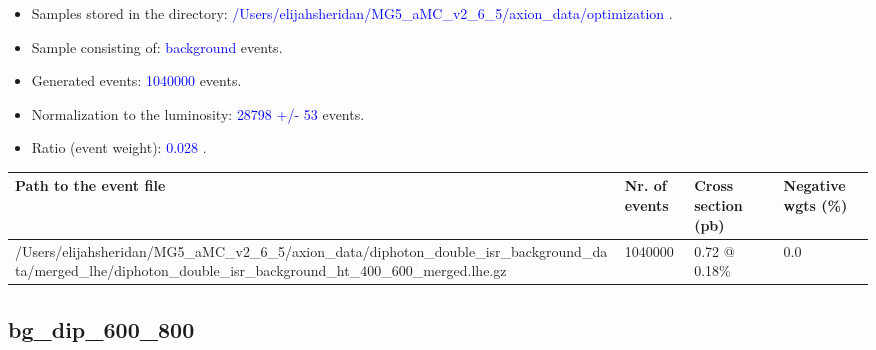 \documentclass[a4paper, 10pt]{article}
\begin{document}
\begin{itemize}
  \item Samples stored in the directory: \textcolor{blue}{/\-Users/\-elijahsheridan/\-MG5\_aMC\_v2\_6\_5/\-axion\_data/\-optimization} .
   \item Sample consisting of: \textcolor{blue}{background}  events.
   \item Generated events: \textcolor{blue}{1040000 }  events.
   \item Normalization to the luminosity: \textcolor{blue}{28798}\textcolor{blue}{ +/\-- }\textcolor{blue}{53 }  events.
   \item Ratio (event weight): \textcolor{blue}{0.028 } .  
 
\end{itemize}
\begin{table}[H]
  \begin{center}
    \begin{tabular}{|m{55.0mm}|m{25.0mm}|m{30.0mm}|m{30.0mm}|}
      \hline
      {\cellcolor{yellow}         Path to the event file}& {\cellcolor{yellow}         Nr. of events}& {\cellcolor{yellow}         Cross section (pb)}& {\cellcolor{yellow}         Negative wgts (\%)}\\
      \hline
      {\cellcolor{white}          /\-Users/\-elijahsheridan/\-MG5\_aMC\_v2\_6\_5/\-axion\_data/\-diphoton\_double\_isr\_background\_data/\-merged\_lhe/\-diphoton\_double\_isr\_background\_ht\_400\_600\_merged.lhe.gz}& {\cellcolor{white}          1040000}& {\cellcolor{white}          0.72 @ 0.18\%}& {\cellcolor{white}          0.0}\\
\hline
    \end{tabular}
  \end{center}
\end{table}

\subsection{ bg\_dip\_600\_800}
\end{document}
